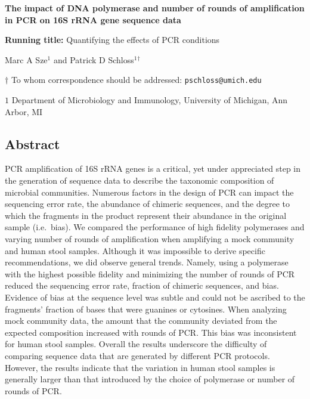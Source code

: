 \documentclass[11pt,]{article}
\title{}
\author{}
\date{}
\begin{document}
\vspace{25mm}
\begin{center}


\textbf{\huge The impact of DNA polymerase and number of rounds of amplification in PCR on 16S rRNA gene sequence data}

\vspace{50mm}



\textbf{Running title:} Quantifying the effects of PCR conditions

\vspace{25mm}

Marc A Sze${^1}$ and Patrick D Schloss${^1}$${^\dagger}$

\vspace{20mm}

$\dagger$ To whom correspondence should be addressed: \texttt{pschloss@umich.edu}

$1$ Department of Microbiology and Immunology, University of Michigan, Ann Arbor, MI

\end{center}

\newpage
\linenumbers

\hypertarget{abstract}{%
\subsection{Abstract}\label{abstract}}

PCR amplification of 16S rRNA genes is a critical, yet under appreciated
step in the generation of sequence data to describe the taxonomic
composition of microbial communities. Numerous factors in the design of
PCR can impact the sequencing error rate, the abundance of chimeric
sequences, and the degree to which the fragments in the product
represent their abundance in the original sample (i.e.~bias). We
compared the performance of high fidelity polymerases and varying number
of rounds of amplification when amplifying a mock community and human
stool samples. Although it was impossible to derive specific
recommendations, we did observe general trends. Namely, using a
polymerase with the highest possible fidelity and minimizing the number
of rounds of PCR reduced the sequencing error rate, fraction of chimeric
sequences, and bias. Evidence of bias at the sequence level was subtle
and could not be ascribed to the fragments' fraction of bases that were
guanines or cytosines. When analyzing mock community data, the amount
that the community deviated from the expected composition increased with
rounds of PCR. This bias was inconsistent for human stool samples.
Overall the results underscore the difficulty of comparing sequence data
that are generated by different PCR protocols. However, the results
indicate that the variation in human stool samples is generally larger
than that introduced by the choice of polymerase or number of rounds of
PCR.
\end{document}
